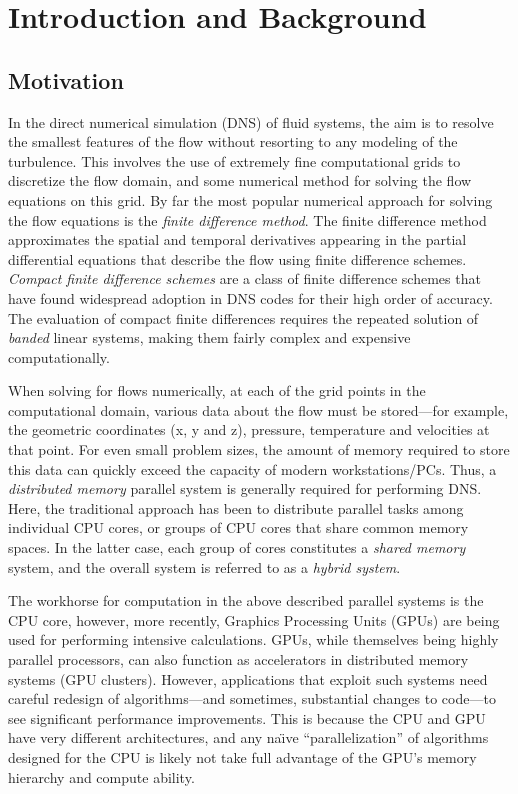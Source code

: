 \chapter{Introduction and Background}

\section{Motivation}

In the direct numerical simulation (DNS) of fluid systems,
the aim is to resolve the smallest features of the flow
without resorting to any modeling of the turbulence.
This involves the use of
extremely fine computational grids to
discretize the flow domain,
and some numerical method for solving the
flow equations on this grid.
By far the most popular numerical approach for
solving the flow equations
is the \emph{finite difference method}.
The finite difference method approximates the
spatial and temporal derivatives appearing in the
partial differential equations that describe the flow
using finite difference schemes.
\emph{Compact finite difference schemes} are a class
of finite difference schemes that have found widespread
adoption in DNS codes
for their high order of accuracy.
The evaluation of compact finite differences
requires the repeated solution of \emph{banded} linear systems,
making them fairly complex and expensive computationally.

When solving for flows numerically,
at each of the grid points in the computational domain,
various data about the flow must be stored---for
example, the geometric coordinates (x, y and z),
pressure, temperature and velocities at that point.
For even small problem sizes,
the amount of memory required to store this data
can quickly exceed the capacity of modern workstations/PCs.
Thus, a \emph{distributed memory} parallel system
is generally required for performing DNS.
Here, the traditional approach has been
to distribute parallel tasks among individual CPU cores,
or groups of CPU cores
that share common memory spaces.
In the latter case,
each group of cores constitutes a \emph{shared memory} system,
and the overall system is referred to as a \emph{hybrid system}.

The workhorse for computation in the above described
parallel systems is the CPU core,
however, more recently,
Graphics Processing Units (GPUs)
are being used for performing intensive calculations.
GPUs, while themselves being highly parallel processors,
can also function as accelerators in distributed memory systems
(GPU clusters).
However,
applications that exploit such systems
need careful redesign of algorithms---and
sometimes, substantial changes to code---to
see significant performance improvements.
This is because the CPU and GPU have very different architectures,
and any na\"{\i}ve ``parallelization'' of algorithms
designed for the CPU
is likely not take full advantage of the GPU's
memory hierarchy and compute ability.

